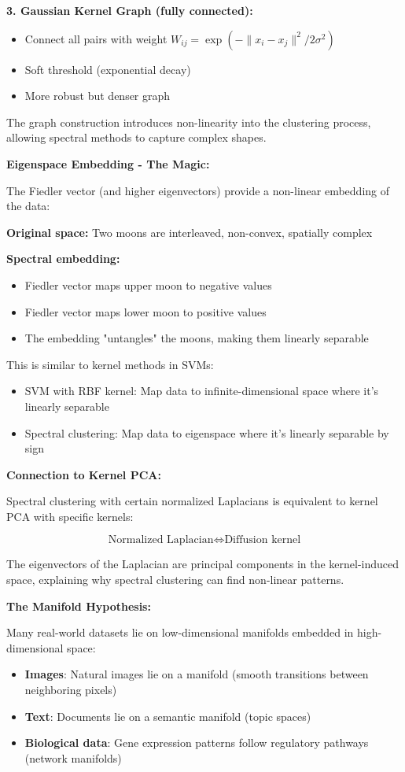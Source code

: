 \documentclass[12pt]{article}
\begin{document}
\begin{explanation}
\textbf{3. Gaussian Kernel Graph (fully connected):}
\begin{itemize}
    \item Connect all pairs with weight $W_{ij} = \exp(-\|x_i - x_j\|^2 / 2\sigma^2)$
    \item Soft threshold (exponential decay)
    \item More robust but denser graph
\end{itemize}

The graph construction introduces non-linearity into the clustering process, allowing spectral methods to capture complex shapes.

\textbf{Eigenspace Embedding - The Magic:}

The Fiedler vector (and higher eigenvectors) provide a non-linear embedding of the data:

\textbf{Original space:} Two moons are interleaved, non-convex, spatially complex

\textbf{Spectral embedding:}
\begin{itemize}
    \item Fiedler vector maps upper moon to negative values
    \item Fiedler vector maps lower moon to positive values
    \item The embedding "untangles" the moons, making them linearly separable
\end{itemize}

This is similar to kernel methods in SVMs:
\begin{itemize}
    \item SVM with RBF kernel: Map data to infinite-dimensional space where it's linearly separable
    \item Spectral clustering: Map data to eigenspace where it's linearly separable by sign
\end{itemize}

\textbf{Connection to Kernel PCA:}

Spectral clustering with certain normalized Laplacians is equivalent to kernel PCA with specific kernels:

\[
\text{Normalized Laplacian} \Leftrightarrow \text{Diffusion kernel}
\]

The eigenvectors of the Laplacian are principal components in the kernel-induced space, explaining why spectral clustering can find non-linear patterns.

\textbf{The Manifold Hypothesis:}

Many real-world datasets lie on low-dimensional manifolds embedded in high-dimensional space:
\begin{itemize}
    \item \textbf{Images}: Natural images lie on a manifold (smooth transitions between neighboring pixels)
    \item \textbf{Text}: Documents lie on a semantic manifold (topic spaces)
    \item \textbf{Biological data}: Gene expression patterns follow regulatory pathways (network manifolds)
\end{itemize}


\end{explanation}
\end{document}
